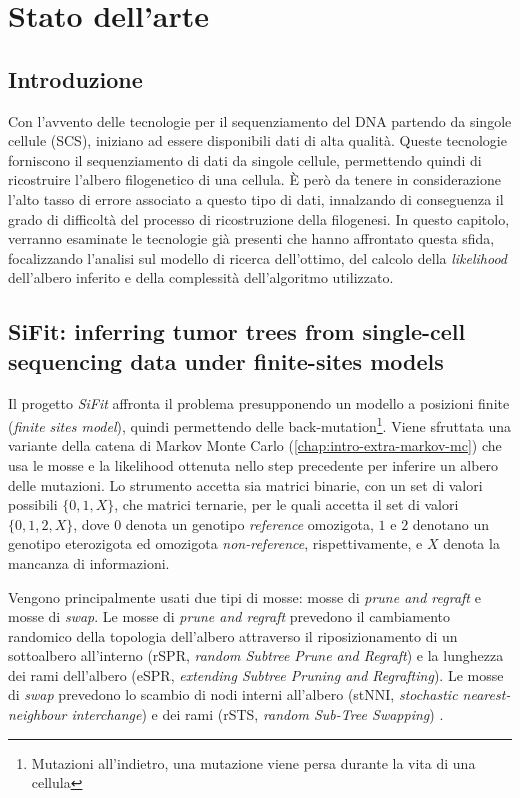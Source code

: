 
\chapter{Stato dell'arte}
\label{chap:art}


\section{Introduzione}
\label{chap:art-intro}
Con l'avvento delle tecnologie per il sequenziamento del DNA partendo da singole cellule (SCS), iniziano ad essere disponibili dati di alta qualità. Queste tecnologie forniscono il sequenziamento di dati da singole cellule, permettendo quindi di ricostruire l'albero filogenetico di una cellula. È però da tenere in considerazione l'alto tasso di errore associato a questo tipo di dati, innalzando di conseguenza il grado di difficoltà del processo di ricostruzione della filogenesi. 
In questo capitolo, verranno esaminate le tecnologie già presenti che hanno affrontato questa sfida, focalizzando l'analisi sul modello di ricerca dell'ottimo, del calcolo della \textit{likelihood} dell'albero inferito e della complessità dell'algoritmo utilizzato.


\section{SiFit: inferring tumor trees from single-cell sequencing data under finite-sites models \cite{sifit}}
\label{chap:art-sifit}
Il progetto \textit{SiFit} affronta il problema presupponendo un modello a posizioni finite (\textit{finite sites model}), quindi permettendo delle back-mutation\footnote{Mutazioni all'indietro, una mutazione viene persa durante la vita di una cellula}. Viene sfruttata una variante della catena di Markov Monte Carlo (\autoref{chap:intro-extra-markov-mc}) che usa le mosse e la likelihood ottenuta nello step precedente per inferire un albero delle mutazioni.
Lo strumento accetta sia matrici binarie, con un set di valori possibili $\{ 0, 1, X \}$, che matrici ternarie, per le quali accetta il set di valori $\{ 0, 1, 2, X \}$, dove $0$ denota un genotipo \textit{reference} omozigota, $1$ e $2$ denotano un genotipo eterozigota ed omozigota \textit{non-reference}, rispettivamente, e $X$ denota la mancanza di informazioni.

Vengono principalmente usati due tipi di mosse: mosse di \textit{prune and regraft} e mosse di \textit{swap}. Le mosse di \textit{prune and regraft} prevedono il cambiamento randomico della topologia dell'albero attraverso il riposizionamento di un sottoalbero all'interno (rSPR, \textit{random Subtree Prune and Regraft}) e la lunghezza dei rami dell'albero (eSPR, \textit{extending Subtree Pruning and Regrafting}). Le mosse di \textit{swap} prevedono lo scambio di nodi interni all'albero (stNNI, \textit{stochastic nearest-neighbour interchange}) e dei rami (rSTS, \textit{random Sub-Tree Swapping}) \cite{sifit, efficiencymcmc}.

